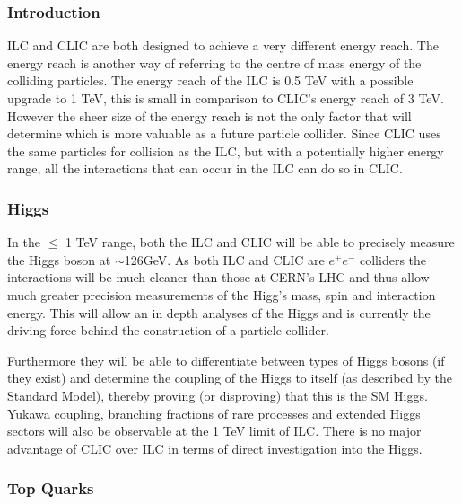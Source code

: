 \subsubsection{Introduction}
ILC and CLIC are both designed to achieve a very different energy reach. The energy reach is another way of referring to the centre of mass energy of the colliding particles.  The energy reach of the ILC is 0.5 TeV with a possible upgrade to 1 TeV, this is small in comparison to CLIC's energy reach of 3 TeV. However the sheer size of the energy reach is not the only factor that will determine which is more valuable as a future particle collider. Since CLIC uses the same particles for collision as the ILC, but with a potentially higher energy range, all the interactions that can occur in the ILC can do so in CLIC.


\subsubsection{Higgs}

In the $\leq$ 1 TeV range, both the ILC and CLIC will be able to precisely measure the Higgs boson at $\sim$126GeV. As both ILC and CLIC are $e^+e^-$ colliders the interactions will be much cleaner than those at CERN's LHC and thus allow much greater precision measurements of the Higg's mass, spin and interaction energy. This will allow an in depth analyses of the Higgs and is currently the driving force behind the construction of a particle collider. 

Furthermore they will be able to differentiate between types of Higgs bosons (if they exist) and determine the coupling of the Higgs to itself (as described by the Standard Model), thereby proving (or disproving) that this is the SM Higgs. Yukawa coupling, branching fractions of rare processes and extended Higgs sectors will also be observable at the 1 TeV limit of ILC. There is no major advantage of CLIC over ILC in terms of direct investigation into the Higgs.

\subsubsection{Top Quarks}

